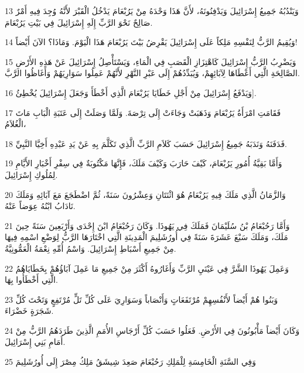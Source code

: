 \par 13 وَيَنْدُبُهُ جَمِيعُ إِسْرَائِيلَ وَيَدْفِنُونَهُ، لأَنَّ هَذَا وَحْدَهُ مِنْ يَرُبْعَامَ يَدْخُلُ الْقَبْرَ لأَنَّهُ وُجِدَ فِيهِ أَمْرٌ صَالِحٌ نَحْوَ الرَّبِّ إِلَهِ إِسْرَائِيلَ فِي بَيْتِ يَرُبْعَامَ.
\par 14 وَيُقِيمُ الرَّبُّ لِنَفْسِهِ مَلِكاً عَلَى إِسْرَائِيلَ يَقْرِضُ بَيْتَ يَرُبْعَامَ هَذَا الْيَوْمَ. وَمَاذَا؟ الآنَ أَيْضاً!
\par 15 وَيَضْرِبُ الرَّبُّ إِسْرَائِيلَ كَاهْتِزَازِ الْقَصَبِ فِي الْمَاءِ، وَيَسْتَأْصِلُ إِسْرَائِيلَ عَنْ هَذِهِ الأَرْضِ الصَّالِحَةِ الَّتِي أَعْطَاهَا لِآبَائِهِمْ، وَيُبَدِّدُهُمْ إِلَى عَبْرِ النَّهْرِ لأَنَّهُمْ عَمِلُوا سَوَارِيَهُمْ وَأَغَاظُوا الرَّبَّ.
\par 16 وَيَدْفَعُ إِسْرَائِيلَ مِنْ أَجْلِ خَطَايَا يَرُبْعَامَ الَّذِي أَخْطَأَ وَجَعَلَ إِسْرَائِيلَ يُخْطِئُ].
\par 17 فَقَامَتِ امْرَأَةُ يَرُبْعَامَ وَذَهَبَتْ وَجَاءَتْ إِلَى تِرْصَةَ. وَلَمَّا وَصَلَتْ إِلَى عَتَبَةِ الْبَابِ مَاتَ الْغُلاَمُ،
\par 18 فَدَفَنَهُ وَنَدَبَهُ جَمِيعُ إِسْرَائِيلَ حَسَبَ كَلاَمِ الرَّبِّ الَّذِي تَكَلَّمَ بِهِ عَنْ يَدِ عَبْدِهِ أَخِيَّا النَّبِيِّ.
\par 19 وَأَمَّا بَقِيَّةُ أُمُورِ يَرُبْعَامَ، كَيْفَ حَارَبَ وَكَيْفَ مَلَكَ، فَإِنَّهَا مَكْتُوبَةٌ فِي سِفْرِ أَخْبَارِ الأَيَّامِ لِمُلُوكِ إِسْرَائِيلَ.
\par 20 وَالزَّمَانُ الَّذِي مَلَكَ فِيهِ يَرُبْعَامُ هُوَ اثْنَتَانِ وَعِشْرُونَ سَنَةً، ثُمَّ اضْطَجَعَ مَعَ آبَائِهِ وَمَلَكَ نَادَابُ ابْنُهُ عِوَضاً عَنْهُ.
\par 21 وَأَمَّا رَحُبْعَامُ بْنُ سُلَيْمَانَ فَمَلَكَ فِي يَهُوذَا. وَكَانَ رَحُبْعَامُ ابْنَ إِحْدَى وَأَرْبَعِينَ سَنَةً حِينَ مَلَكَ، وَمَلَكَ سَبْعَ عَشَرَةَ سَنَةً فِي أُورُشَلِيمَ الْمَدِينَةِ الَّتِي اخْتَارَهَا الرَّبُّ لِوَضْعِ اسْمِهِ فِيهَا مِنْ جَمِيعِ أَسْبَاطِ إِسْرَائِيلَ. وَاسْمُ أُمِّهِ نِعْمَةُ الْعَمُّونِيَّةُ.
\par 22 وَعَمِلَ يَهُوذَا الشَّرَّ فِي عَيْنَيِ الرَّبِّ وَأَغَارُوهُ أَكْثَرَ مِنْ جَمِيعِ مَا عَمِلَ آبَاؤُهُمْ بِخَطَايَاهُمُ الَّتِي أَخْطَأُوا بِهَا.
\par 23 وَبَنُوا هُمْ أَيْضاً لأَنْفُسِهِمْ مُرْتَفَعَاتٍ وَأَنْصَاباً وَسَوَارِيَ عَلَى كُلِّ تَلٍّ مُرْتَفِعٍ وَتَحْتَ كُلِّ شَجَرَةٍ خَضْرَاءَ.
\par 24 وَكَانَ أَيْضاً مَأْبُونُونَ فِي الأَرْضِ. فَعَلُوا حَسَبَ كُلِّ أَرْجَاسِ الأُمَمِ الَّذِينَ طَرَدَهُمُ الرَّبُّ مِنْ أَمَامِ بَنِي إِسْرَائِيلَ.
\par 25 وَفِي السَّنَةِ الْخَامِسَةِ لِلْمَلِكِ رَحُبْعَامَ صَعِدَ شِيشَقُ مَلِكُ مِصْرَ إِلَى أُورُشَلِيمَ

